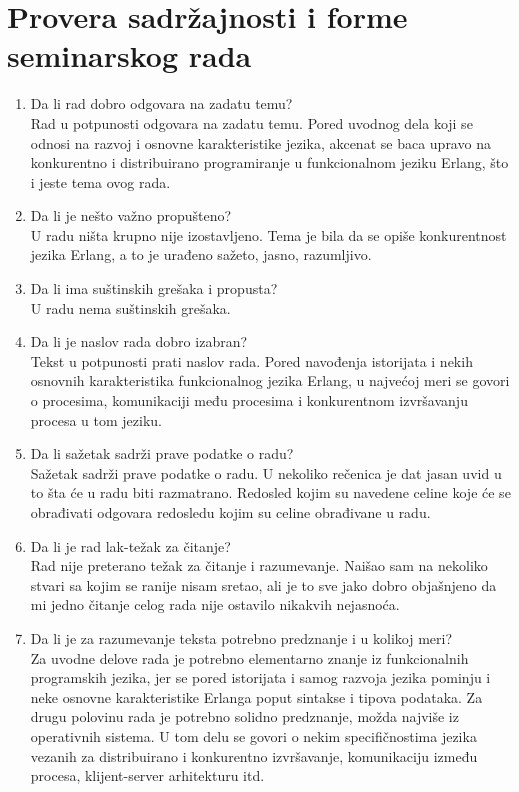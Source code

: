 \documentclass[a4paper]{report}
\begin{document}
\section{Provera sadržajnosti i forme seminarskog rada}

\begin{enumerate}
\item Da li rad dobro odgovara na zadatu temu?\\    
Rad u potpunosti odgovara na zadatu temu. Pored uvodnog dela koji se odnosi na razvoj i osnovne karakteristike jezika, akcenat se baca upravo na konkurentno i distribuirano programiranje u funkcionalnom jeziku Erlang, što i jeste tema ovog rada. 


\item Da li je nešto važno propušteno?\\
U radu ništa krupno nije izostavljeno. Tema je bila da se opiše konkurentnost jezika Erlang, a to je urađeno sažeto, jasno, razumljivo.


\item Da li ima suštinskih grešaka i propusta?\\
U radu nema suštinskih grešaka.


\item Da li je naslov rada dobro izabran?\\
Tekst u potpunosti prati naslov rada. Pored navođenja istorijata i nekih osnovnih karakteristika funkcionalnog jezika Erlang, u najvećoj meri se govori o procesima, komunikaciji među procesima i konkurentnom izvršavanju procesa u tom jeziku.


\item Da li sažetak sadrži prave podatke o radu?\\
Sažetak sadrži prave podatke o radu. U nekoliko rečenica je dat jasan uvid u to šta će u radu biti razmatrano. Redosled kojim su navedene celine koje će se obrađivati odgovara redosledu kojim su celine obrađivane u radu.


\item Da li je rad lak-težak za čitanje?\\
Rad nije preterano težak za čitanje i razumevanje. Naišao sam na nekoliko stvari sa kojim se ranije nisam sretao, ali je to sve jako dobro objašnjeno da mi jedno čitanje celog rada nije ostavilo nikakvih nejasnoća. 



\item Da li je za razumevanje teksta potrebno predznanje i u kolikoj meri?\\
Za uvodne delove rada je potrebno elementarno znanje iz funkcionalnih programskih jezika, jer se pored istorijata i samog razvoja jezika pominju i neke osnovne karakteristike Erlanga poput sintakse i tipova podataka. Za drugu polovinu rada je potrebno solidno predznanje, možda najviše iz operativnih sistema. U tom delu se govori o nekim specifičnostima jezika vezanih za distribuirano i konkurentno izvršavanje, komunikaciju između procesa, klijent-server arhitekturu itd.



\end{enumerate}
\end{document}
